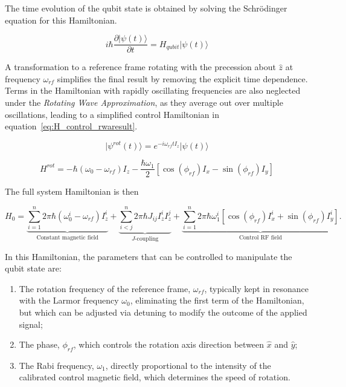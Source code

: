 The time evolution of the qubit state is obtained by solving the Schrödinger equation for this Hamiltonian.

\begin{equation}
    i\hbar\frac{\partial\lvert\psi(t)\rangle}{\partial t}=H_{qubit}\lvert\psi(t)\rangle
    \label{eq:shrodinger_rwa}
\end{equation}

A transformation to a reference frame rotating with the precession about \(\hat{z}\) at frequency \(\omega_{rf}\) simplifies the final result by removing the explicit time dependence. Terms in the Hamiltonian with rapidly oscillating frequencies are also neglected under the \emph{Rotating Wave Approximation}, as they average out over multiple oscillations, leading to a simplified control Hamiltonian in equation~\ref{eq:H_control_rwaresult}.

\begin{equation}
    \lvert\psi^{rot}(t)\rangle=e^{-i\omega_{rf}tI_z}\lvert\psi(t)\rangle
    \label{eq:reference_transform}
\end{equation}

\begin{equation}
    H^{rot}=-\hbar(\omega_0-\omega_{rf})I_z-\frac{\hbar\omega_1}{2}[\cos(\phi_{rf})I_x-\sin(\phi_{rf})I_y]
    \label{eq:H_control_rwaresult}
\end{equation}

The full system Hamiltonian is then

\begin{equation}
H_0=
\underbrace{\sum_{i=1}^{n}2\pi\hbar(\omega_{0}^{i}-\omega_{rf})I_z^i}_{\text{Constant magnetic field}}
+
\underbrace{\sum_{i<j}^{n}2\pi\hbar J_{ij}I_z^i I_z^j}_{J\text{-coupling}}
+
\underbrace{\sum_{i=1}^{n}2\pi\hbar\omega_1^i
\left[\cos(\phi_{rf})I_x^i+\sin(\phi_{rf})I_y^i\right]}_{\text{Control RF field}}.
\label{eq:full_Hamiltonian}
\end{equation}


In this Hamiltonian, the parameters that can be controlled to manipulate the qubit state are:

\begin{enumerate}
    \item The rotation frequency of the reference frame, \(\omega_{rf}\), typically kept in resonance with the Larmor frequency \(\omega_0\), eliminating the first term of the Hamiltonian, but which can be adjusted via detuning to modify the outcome of the applied signal;
    \item The phase, \(\phi_{rf}\), which controls the rotation axis direction between \(\hat{x}\) and \(\hat{y}\);
    \item The Rabi frequency, \(\omega_1\), directly proportional to the intensity of the calibrated control magnetic field, which determines the speed of rotation.
\end{enumerate}

